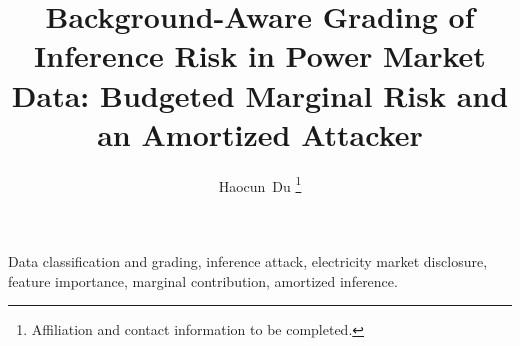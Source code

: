\documentclass[journal]{IEEEtran}
\begin{document}
\title{Background-Aware Grading of Inference Risk in Power Market Data: Budgeted Marginal Risk and an Amortized Attacker}

\author{Haocun~Du%
\thanks{Affiliation and contact information to be completed.}}


\maketitle



\begin{IEEEkeywords}
Data classification and grading, inference attack, electricity market disclosure, feature importance, marginal
contribution, amortized inference.
\end{IEEEkeywords}






\FloatBarrier


\appendices




\end{document}
